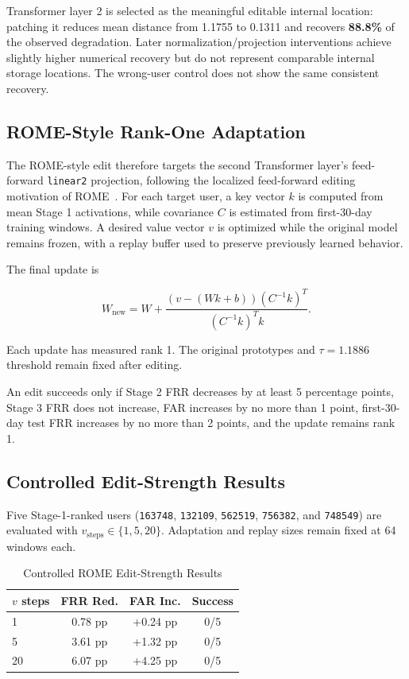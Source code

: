 \documentclass[conference]{IEEEtran}
\begin{document}
Transformer layer 2 is selected as the meaningful editable internal location: patching it reduces mean distance from 1.1755 to 0.1311 and recovers \textbf{88.8\%} of the observed degradation. Later normalization/projection interventions achieve slightly higher numerical recovery but do not represent comparable internal storage locations. The wrong-user control does not show the same consistent recovery.


\subsection{ROME-Style Rank-One Adaptation}

The ROME-style edit therefore targets the second Transformer layer's feed-forward \texttt{linear2} projection, following the localized feed-forward editing motivation of ROME~\cite{rome}. For each target user, a key vector $k$ is computed from mean Stage 1 activations, while covariance $C$ is estimated from first-30-day training windows. A desired value vector $v$ is optimized while the original model remains frozen, with a replay buffer used to preserve previously learned behavior.

The final update is

\begin{equation}
W_{\mathrm{new}}=
W+
\frac{(v-(Wk+b))(C^{-1}k)^T}
{(C^{-1}k)^Tk}.
\label{eq:rome}
\end{equation}

Each update has measured rank 1. The original prototypes and $\tau=1.1886$ threshold remain fixed after editing.

An edit succeeds only if Stage 2 FRR decreases by at least 5 percentage points, Stage 3 FRR does not increase, FAR increases by no more than 1 point, first-30-day test FRR increases by no more than 2 points, and the update remains rank 1.


\subsection{Controlled Edit-Strength Results}

Five Stage-1-ranked users (\texttt{163748}, \texttt{132109}, \texttt{562519}, \texttt{756382}, and \texttt{748549}) are evaluated with $v_{\mathrm{steps}}\in\{1,5,20\}$. Adaptation and replay sizes remain fixed at 64 windows each.

\begin{table}[htbp]
\caption{Controlled ROME Edit-Strength Results}
\label{tab:rome}
\centering
\begin{tabular}{lccc}
\toprule
\textbf{$v$ steps} & \textbf{FRR Red.} & \textbf{FAR Inc.} & \textbf{Success}\\
\midrule
1 & 0.78 pp & +0.24 pp & 0/5\\
5 & 3.61 pp & +1.32 pp & 0/5\\
20 & 6.07 pp & +4.25 pp & 0/5\\
\bottomrule
\end{tabular}
\end{table}
\end{document}
